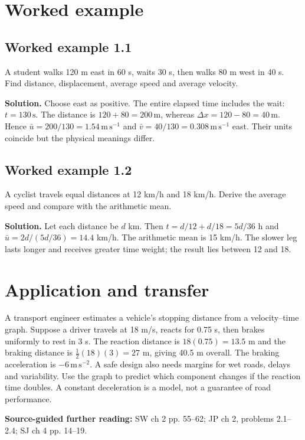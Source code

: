 \documentclass[11pt,a4paper,openany]{book}
\begin{document}
\section{Worked example}
\subsection*{Worked example 1.1}
A student walks 120 m east in 60 s, waits 30 s, then walks 80 m west in 40 s. Find distance, displacement, average speed and average velocity.

\textbf{Solution.} Choose east as positive. The entire elapsed time includes the wait: $t=130\,\mathrm{s}$. The distance is $120+80=200\,\mathrm{m}$, whereas $\Delta x=120-80=40\,\mathrm{m}$. Hence $\bar u=200/130=1.54\,\mathrm{m\,s^{-1}}$ and $\bar v=40/130=0.308\,\mathrm{m\,s^{-1}}$ east. Their units coincide but the physical meanings differ.
\subsection*{Worked example 1.2}
A cyclist travels equal distances at 12 km/h and 18 km/h. Derive the average speed and compare with the arithmetic mean.

\textbf{Solution.} Let each distance be $d$ km. Then $t=d/12+d/18=5d/36$ h and $\bar u=2d/(5d/36)=14.4$ km/h. The arithmetic mean is 15 km/h. The slower leg lasts longer and receives greater time weight; the result lies between 12 and 18.
\section{Application and transfer}
A transport engineer estimates a vehicle's stopping distance from a velocity--time graph. Suppose a driver travels at 18 m/s, reacts for 0.75 s, then brakes uniformly to rest in 3 s. The reaction distance is $18(0.75)=13.5$ m and the braking distance is $\frac12(18)(3)=27$ m, giving 40.5 m overall. The braking acceleration is $-6\,\mathrm{m\,s^{-2}}$. A safe design also needs margins for wet roads, delays and variability. Use the graph to predict which component changes if the reaction time doubles. A constant deceleration is a model, not a guarantee of road performance.

\textbf{Source-guided further reading:} SW ch 2 pp. 55–62; JP ch 2, problems 2.1–2.4; SJ ch 4 pp. 14–19.
\end{document}
